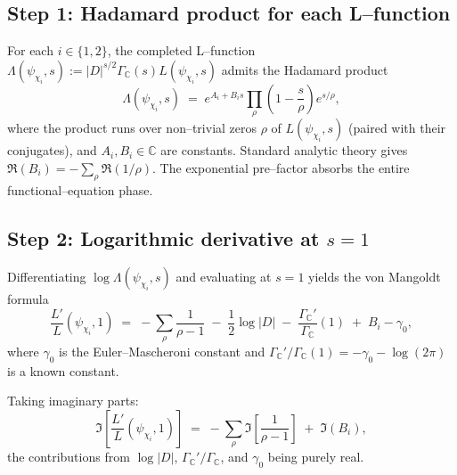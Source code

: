 \documentclass[11pt]{amsart}
\theoremstyle{definition}
\theoremstyle{remark}
\newcommand{\C}{\mathbb{C}}
\begin{document}
\subsection*{Step 1: Hadamard product for each L--function}
For each \(i \in \{1, 2\}\), the completed L--function
\(\Lambda(\psi_{\chi_i}, s) := |D|^{s/2} \Gamma_\C(s) L(\psi_{\chi_i}, s)\)
admits the Hadamard product
\begin{equation}\label{eq:Hadamard}
  \Lambda(\psi_{\chi_i}, s)
  \;=\;
  e^{A_i + B_i s} \prod_{\rho} \left( 1 - \frac{s}{\rho} \right) e^{s/\rho} ,
\end{equation}
where the product runs over non--trivial zeros \(\rho\) of
\(L(\psi_{\chi_i}, s)\) (paired with their conjugates), and
\(A_i, B_i \in \C\) are constants. Standard analytic theory gives
\(\Re(B_i) = -\sum_\rho \Re(1/\rho)\). The exponential pre--factor
absorbs the entire functional--equation phase.

\subsection*{Step 2: Logarithmic derivative at \(s = 1\)}
Differentiating \(\log\Lambda(\psi_{\chi_i}, s)\) and evaluating at
\(s = 1\) yields the von Mangoldt formula
\begin{equation}\label{eq:vM}
  \frac{L'}{L}(\psi_{\chi_i}, 1)
  \;=\;
  -\sum_\rho \frac{1}{\rho - 1}
  \;-\; \frac{1}{2}\log|D|
  \;-\; \frac{\Gamma_\C'}{\Gamma_\C}(1)
  \;+\; B_i - \gamma_0 ,
\end{equation}
where \(\gamma_0\) is the Euler--Mascheroni constant and
\(\Gamma_\C'/\Gamma_\C(1) = -\gamma_0 - \log(2\pi)\) is a known
constant.

Taking imaginary parts:
\begin{equation}\label{eq:vM-imag}
  \Im\!\left[\frac{L'}{L}(\psi_{\chi_i}, 1)\right]
  \;=\;
  -\sum_\rho \Im\!\left[ \frac{1}{\rho - 1} \right]
  \;+\; \Im(B_i) ,
\end{equation}
the contributions from \(\log|D|\), \(\Gamma_\C'/\Gamma_\C\), and
\(\gamma_0\) being purely real.
\end{document}
